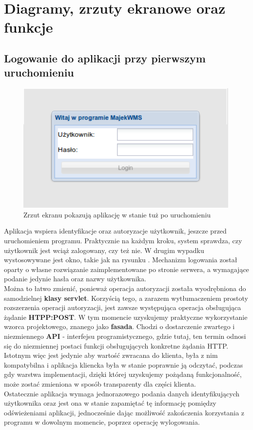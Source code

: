 \section{Diagramy, zrzuty ekranowe oraz funkcje}
	\subsection{Logowanie do aplikacji przy pierwszym uruchomieniu}
		\begin{figure}[H]
			\centering
			\includegraphics[width=0.99\textwidth]{images/app/login}
			\caption[Aplikacja - Logowanie do programu]{Zrzut ekranu pokazują aplikację w stanie tuż po uruchomieniu}
			\label{c7:fig:app:login}
		\end{figure}
		Aplikacja wspiera identyfikacje oraz autoryzacje użytkownik, jeszcze przed uruchomieniem programu. Praktycznie
		na każdym kroku, system sprawdza, czy użytkownik jest wciąż zalogowany, czy też nie. W drugim wypadku
		wystosowywane jest okno, takie jak na rysunku \label{c7:fig:app::login}. Mechanizm logowania został oparty
		o własne rozwiązanie zaimplementowane po stronie serwera, a wymagające podanie jedynie hasła oraz 
		nazwy użytkownika.\\ Można to łatwo zmienić, ponieważ operacja autoryzacji została wyodrębniona
		do samodzielnej \textbf{klasy servlet}. Korzyścią tego, a zarazem wytłumaczeniem prostoty rozszerzenia
		operacji autoryzacji, jest zawsze występująca operacja obsługująca żądanie \textbf{HTPP:POST}.
		W tym momencie uzyskujemy praktyczne wykorzystanie wzorca projektowego, znanego jako \textbf{fasada}.
		Chodzi o dostarczenie zwartego i niezmiennego \textbf{API} - interfejsu programistycznego, gdzie tutaj, ten termin odnosi się
		do niezmiennej postaci funkcji obsługujących konkretne żądania HTTP.
		Istotnym więc jest jedynie aby wartość zwracana do klienta, była
		z nim kompatybilna i aplikacja kliencka była w stanie poprawnie ją odczytać, podczas gdy warstwa
		implementacji, dzięki której uzyskujemy pożądaną funkcjonalność,
		może zostać zmieniona w sposób transparenty dla części klienta. \\
		Ostatecznie aplikacja wymaga jednorazowego podania danych identyfikujących użytkownika oraz
		jest ona w stanie zapamiętać tę informację pomiędzy odświeżeniami aplikacji, jednocześnie
		dając możliwość zakończenia korzystania z programu w dowolnym momencie, poprzez operację
		wylogowania.
		
